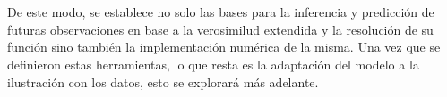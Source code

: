 \\
\\
De este modo, se establece no solo las bases para la inferencia y predicci\'on de futuras observaciones en base a la verosimilud extendida y la resoluci\'on de su funci\'on sino tambi\'en la implementaci\'on num\'erica de la misma. Una vez que se definieron estas herramientas, lo que resta es la adaptaci\'on del modelo a la ilustraci\'on con los datos, esto se explorar\'a m\'as adelante.